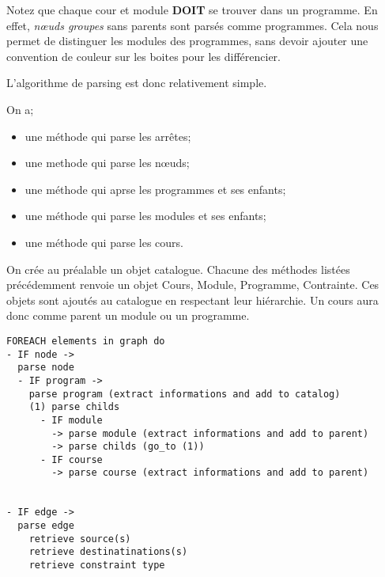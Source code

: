 Notez que chaque cour et module \textbf{DOIT} se trouver dans un programme. En effet, \textit{nœuds groupes} sans parents sont parsés comme programmes. Cela nous permet de distinguer les modules des programmes, sans devoir ajouter une convention de couleur sur les boites pour les différencier.  

L'algorithme de parsing est donc relativement simple.

On a;
\begin{itemize}
  \item une méthode qui parse les arrêtes; 
  \item une methode qui parse les nœuds;
  \item une méthode qui aprse les programmes et ses enfants;
  \item une méthode qui parse les modules et ses enfants;
  \item une méthode qui parse les cours.
\end{itemize}

On crée au préalable un objet catalogue. Chacune des méthodes listées précédemment renvoie un objet Cours, Module, Programme, Contrainte. Ces objets sont ajoutés au catalogue en respectant leur hiérarchie. Un cours aura donc comme parent un module ou un programme. 


\begin{lstlisting}
FOREACH elements in graph do
- IF node -> 
  parse node
  - IF program -> 
    parse program (extract informations and add to catalog)
    (1) parse childs
      - IF module
        -> parse module (extract informations and add to parent)
        -> parse childs (go_to (1))
      - IF course
        -> parse course (extract informations and add to parent)


- IF edge -> 
  parse edge
    retrieve source(s)
    retrieve destinatinations(s)
    retrieve constraint type
\end{lstlisting}



